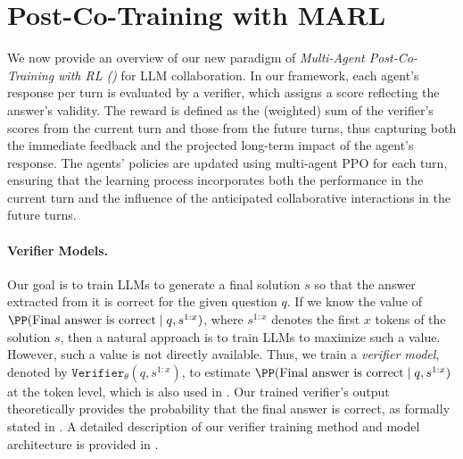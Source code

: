 \section{{Post-Co-Training} with MARL}
\label{sec:MARL}

\safevspace{-2mm}
{We now provide an overview of our new paradigm of \textit{Multi-Agent Post-Co-Training with RL (\ours)} for LLM collaboration. 
In our framework, each agent's response per turn is evaluated by a verifier, which assigns a score reflecting the answer's validity. The reward 
is defined as the (weighted) sum of the verifier's scores from the current turn and those from the future turns, thus capturing both the immediate feedback and the projected long-term impact of the agent's response. The agents’ policies are updated using multi-agent PPO for each turn, ensuring that the learning process incorporates both the performance {in the current turn} and the influence of the anticipated collaborative interactions {in the future turns}.} 

\safevspace{-2mm}
\paragraph{Verifier Models. }
Our goal is to train LLMs to generate a final solution \( s \) so that the answer extracted from it is correct for the given question \( q \). If we know the value of \( \PP(\text{Final answer is correct} \mid q, s^{1:x}) \),  where $s^{1:x}$ denotes the first $x$ tokens of the solution $s$, then a natural approach is to train LLMs to maximize such a value. {However, such a value is not directly available.} Thus, we train a {\it verifier model}, denoted by \( \texttt{Verifier}_{\theta}(q, s^{1:x}) \), to estimate \( \PP(\text{Final answer is correct} \mid q, s^{1:x}) \) at the token level, which is also used in \citet{cobbe2021training, yu2023outcome, liu2023tinygsm}. Our trained verifier's output theoretically provides the probability that the final answer is correct, as formally stated in . A detailed description of our verifier training method and model architecture is provided in .





